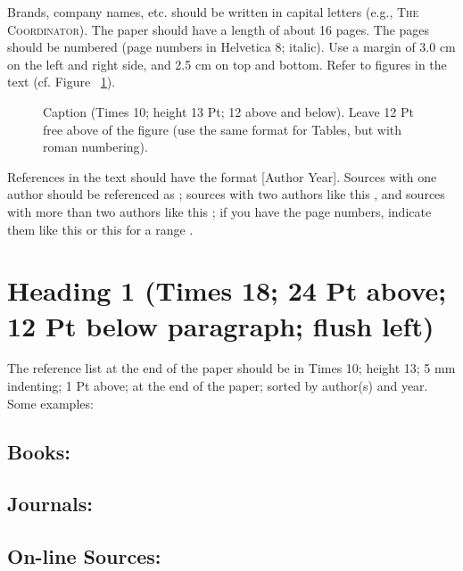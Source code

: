 \documentclass{CML_Seminar_Template}
\begin{document}
Brands, company names, etc. should be written in capital letters (e.g., \textsc{The Coordinator}). The paper should have a length of about 16 pages. The pages should be numbered (page numbers in Helvetica 8; italic). Use a margin of 3.0 cm on the left and right side, and 2.5 cm on top and bottom. Refer to figures in the text (cf. Figure ~\ref{CML_Seminar_Template_fig1}).


\begin{figure}[htb]
  \begin{center}
  \end{center}
    \caption{\label{CML_Seminar_Template_fig1} Caption (Times 10; height 13 Pt; 12 above and below). Leave 12 Pt free above of the figure (use the same format for Tables, but with roman numbering).}
\end{figure}

References in the text should have the format [Author Year]. Sources with one author should be referenced as \cite[]{Gro1995}; sources with two authors like this \cite[]{MaVa1984}, and sources with more than two authors like this \cite[]{Ham2002}; if you have the page numbers, indicate them like this \cite[p. 16]{Gro1995} or this for a range \cite[pp. 16-17]{Gro1995}. 

\section{Heading 1 (Times 18; 24 Pt above; 12 Pt below paragraph; flush left)}

The reference list at the end of the paper should be in Times 10; height 13; 5 mm indenting; 1 Pt above; at the end of the paper; sorted by author(s) and year. Some examples: 


\subsection*{Books:} 

\cite[]{Ham2002, MaVa1984}

\subsection*{Journals:}

\cite[]{Gro1995}

\subsection*{On-line Sources:} 
\end{document}

